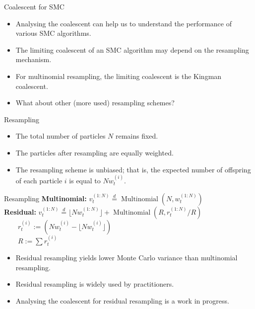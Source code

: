 \documentclass[aspectratio=169]{beamer}
\theoremstyle{definition}
\newcommand{\eqdist}{\overset{d}{=}}
\newcommand{\vt}[2][t]{v_{#1}^{(#2)}}
\newcommand{\wt}[2][t]{w_{#1}^{(#2)}}
\begin{document}
\begin{frame}{Coalescent for SMC}
\begin{itemize}
\item Analysing the coalescent can help us to understand the performance of various SMC algorithms.
\item The limiting coalescent of an SMC algorithm may depend on the resampling mechanism.
\item For multinomial resampling, the limiting coalescent is the Kingman coalescent.
\item What about other (more used) resampling schemes?
\end{itemize}
\end{frame}

\begin{frame}{Resampling}
\begin{itemize}
\item The total number of particles $N$ remains fixed. 
\item The particles after resampling are equally weighted. 
\item The resampling scheme is unbiased; that is, the expected number of offspring of each particle $i$ is equal to $N\wt{i}$.
\end{itemize}
\end{frame}

\begin{frame}{Resampling}
\textbf{Multinomial:}
$\vt{1:N} \eqdist \operatorname{Multinomial}(N, \wt{1:N})$\\[12pt]
\textbf{Residual:}
$\vt{1:N} \eqdist \lfloor N \wt{1:N} \rfloor +  \operatorname{Multinomial}(R, r_t^{(1:N)}/R)$\\[7pt]
$\qquad r_t^{(i)} := (N \wt{i} - \lfloor N \wt{i}\rfloor)$\\[7pt]
$\qquad R:= \sum r_t^{(i)}$\\[12pt]
\begin{itemize}
\item Residual resampling yields lower Monte Carlo variance than multinomial resampling.
\item Residual resampling is widely used by practitioners.
\item Analysing the coalescent for residual resampling is a work in progress.
\end{itemize}
\end{frame}
\end{document}
